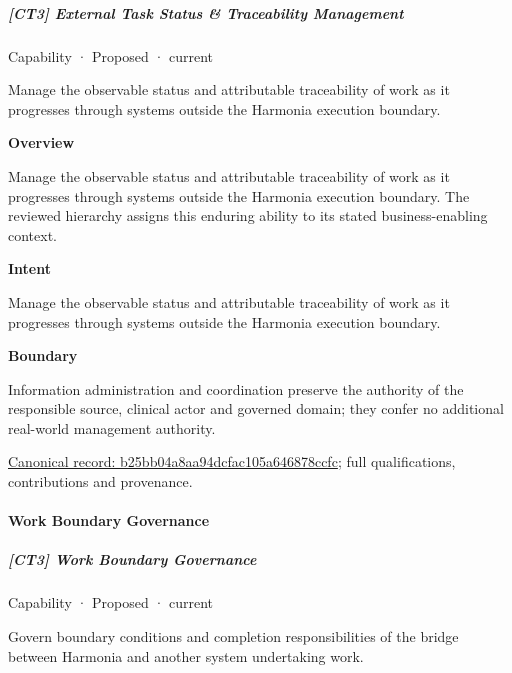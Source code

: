 \subparagraph{[CT3] External Task Status \& Traceability Management}

\label{element:b25bb04a8aa94dcfac105a646878ccfc}
{\small Capability · Proposed · current}\par

Manage the observable status and attributable traceability of work as it progresses through systems outside the Harmonia execution boundary.



\textbf{Overview}



Manage the observable status and attributable traceability of work as it progresses through systems outside the Harmonia execution boundary. The reviewed hierarchy assigns this enduring ability to its stated business-enabling context.



\textbf{Intent}



Manage the observable status and attributable traceability of work as it progresses through systems outside the Harmonia execution boundary.



\textbf{Boundary}



Information administration and coordination preserve the authority of the responsible source, clinical actor and governed domain; they confer no additional real-world management authority.


{\footnotesize \href{../../../../continuum/strategy/capability/b25bb04a8aa94dcfac105a646878ccfc.md}{Canonical record: b25bb04a8aa94dcfac105a646878ccfc}; full qualifications, contributions and provenance.}\par
\paragraph{Work Boundary Governance}

\subparagraph{[CT3] Work Boundary Governance}

\label{element:35b66a0b38db4568849ecb842ffdcbf3}
{\small Capability · Proposed · current}\par

Govern boundary conditions and completion responsibilities of the bridge between Harmonia and another system undertaking work.



